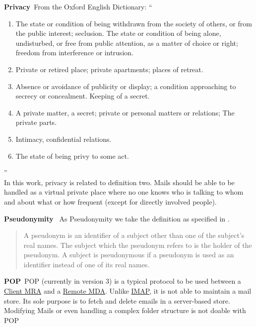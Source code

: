 \documentclass[a4paper,appendixprefix,pdfusetitle,twocolumn,fontsize=8pt,DIV=calc,8pt,draft]{\doctype} %
\newenvironment{entry}{\par\leavevmode\hangpara{1.5mm}{1}\ignorespaces}{\RaggedRight\par}
\newcommand*{\mainentry}[2]{{\bfseries{#1\label{def:#1}}}~#2\par}
\newcommand*{\defref}[1]{\hyperref[def:#1]{#1}}
\begin{document}
\begin{entry}
	\mainentry{Privacy}{From the Oxford English Dictionary: ``
		\begin{enumerate}
			\item The state or condition of being withdrawn from the society of others, or from the public interest; seclusion. The state or condition of being alone, undisturbed, or free from public attention, as a matter of choice or right; freedom from interference or intrusion.
			\item Private or retired place; private apartments; places of retreat.
			\item Absence or avoidance of publicity or display; a condition approaching to secrecy or concealment. Keeping of a secret.
			\item A private matter, a secret; private or personal matters or relations; The private parts.
			\item Intimacy, confidential relations.
			\item The state of being privy to some act.
		\end{enumerate}''\cite{OXFORD}\\
		In this work, privacy is related to definition two. Mails should be able to be handled as a virtual private place where no one knows who is talking to whom and about what or how frequent (except for directly involved people).
	}
\end{entry}

\begin{entry}
	\mainentry{Pseudonymity}{
		As Pseudonymity we take the definition as specified in \cite{anonTerminology}.
		\begin{quote}
			A pseudonym is an identifier of a subject other than one of the subject's real names. The subject which the pseudonym refers to is the holder of the pseudonym. A subject is pseudonymous if a pseudonym is used as an identifier instead of one of its real names.\omitted
		\end{quote}
	}
\end{entry}

\begin{entry}
	\mainentry{POP}{POP (currently in version 3) is a typical protocol to be used between a \defref{Client MRA} and a \defref{Remote MDA}. Unlike \defref{IMAP}, it is not able to maintain a mail store. Its sole purpose is to fetch and delete emails in a server-based store. Modifying Mails or even handling a complex folder structure is not doable with POP}
\end{entry}
\end{document}
